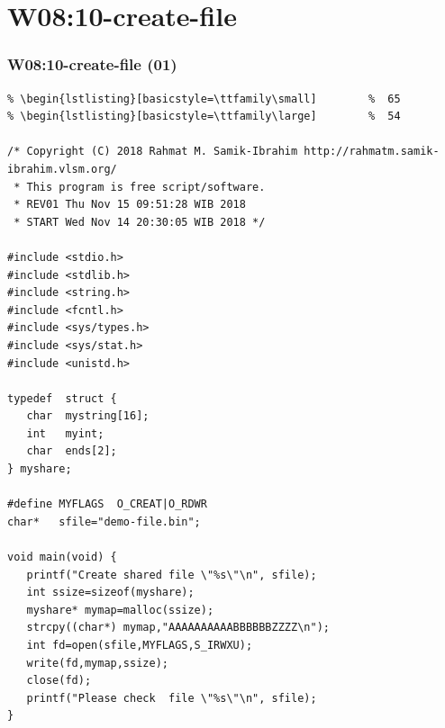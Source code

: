 \documentclass[xcolor=table, notheorems, hyperref={pdfpagelabels=false}]{beamer}
\begin{document}
\section {W08:10-create-file}
\begin{frame}[fragile]
\frametitle{W08:10-create-file (01)}
\begin{lstlisting}[basicstyle=\ttfamily\tiny]         % 108
% \begin{lstlisting}[basicstyle=\ttfamily\footnotesize] %  72
% \begin{lstlisting}[basicstyle=\ttfamily\small]        %  65
% \begin{lstlisting}[basicstyle=\ttfamily\large]        %  54

/* Copyright (C) 2018 Rahmat M. Samik-Ibrahim http://rahmatm.samik-ibrahim.vlsm.org/
 * This program is free script/software.
 * REV01 Thu Nov 15 09:51:28 WIB 2018
 * START Wed Nov 14 20:30:05 WIB 2018 */

#include <stdio.h>
#include <stdlib.h>
#include <string.h>
#include <fcntl.h>
#include <sys/types.h>
#include <sys/stat.h>
#include <unistd.h>

typedef  struct {
   char  mystring[16];
   int   myint;
   char  ends[2];
} myshare;

#define MYFLAGS  O_CREAT|O_RDWR
char*   sfile="demo-file.bin";

void main(void) {
   printf("Create shared file \"%s\"\n", sfile);
   int ssize=sizeof(myshare);
   myshare* mymap=malloc(ssize);
   strcpy((char*) mymap,"AAAAAAAAAABBBBBBZZZZ\n");
   int fd=open(sfile,MYFLAGS,S_IRWXU);
   write(fd,mymap,ssize);
   close(fd);
   printf("Please check  file \"%s\"\n", sfile);
}

\end{lstlisting}
\end{frame}
\end{document}
